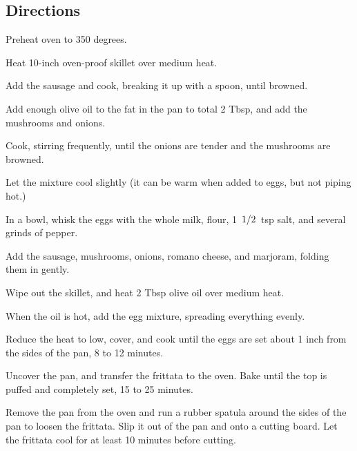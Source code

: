 \documentclass{article}
\newcounter{qcounter}
\begin{document}
\subsection*{Directions}
\begin{list}{:~}{}

\item Preheat oven to 350 degrees.  
\item Heat 10-inch oven-proof skillet over medium heat.  
\item Add the sausage and cook, breaking it up with a spoon, until browned.  
\item Add enough olive oil to the fat in the pan to total 2 Tbsp, and add the mushrooms and onions.  
\item Cook, stirring frequently, until the onions are tender and the mushrooms are browned.  
\item Let the mixture cool slightly (it can be warm when added to eggs, but not piping hot.)  
\item In a bowl, whisk the eggs with the whole milk, flour, 1 $\left.1\middle/2\right.$ tsp salt, and several grinds of pepper.  
\item Add the sausage, mushrooms, onions, romano cheese, and marjoram, folding them in gently. 
\item Wipe out the skillet, and heat 2 Tbsp olive oil over medium heat.  
\item When the oil is hot, add the egg mixture, spreading everything evenly.  
\item Reduce the heat to low, cover, and cook until the eggs are set about 1 inch from the sides of the pan, 8 to 12 minutes.  
\item Uncover the pan, and transfer the frittata to the oven.  Bake until the top is puffed and completely set, 15 to 25 minutes.  
\item Remove the pan from the oven and run a rubber spatula around the sides of the pan to loosen the frittata.  
Slip it out of the pan and onto a cutting board.  Let the frittata cool for at least 10 minutes before cutting.
\end{list}
\end{document}
